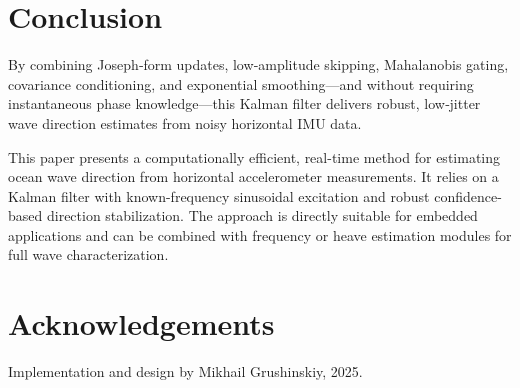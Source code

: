 \documentclass[12pt]{article}
\begin{document}
\section{Conclusion}
By combining Joseph‐form updates, low‐amplitude skipping, Mahalanobis gating, covariance conditioning, and exponential smoothing—and without requiring instantaneous phase knowledge—this Kalman filter delivers robust, low‐jitter wave direction estimates from noisy horizontal IMU data.\par
\vspace{1ex}
\noindent This paper presents a computationally efficient, real-time method for estimating ocean wave direction from horizontal accelerometer measurements. It relies on a Kalman filter with known-frequency sinusoidal excitation and robust confidence-based direction stabilization. The approach is directly suitable for embedded applications and can be combined with frequency or heave estimation modules for full wave characterization.

\section*{Acknowledgements}
Implementation and design by Mikhail Grushinskiy, 2025.
\end{document}
